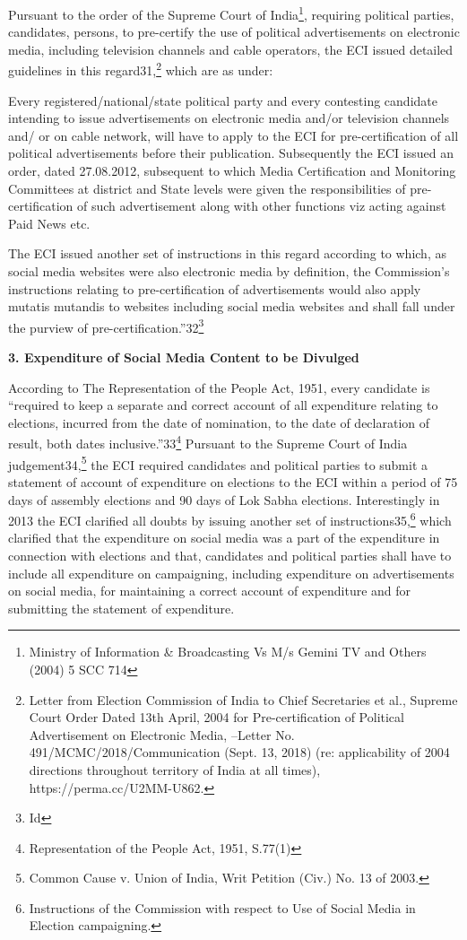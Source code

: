 \begin{multicols}{2}
\noi
Pursuant to the order of the Supreme Court of India\footnote{ Ministry of Information & Broadcasting Vs M/s Gemini TV and Others (2004) 5 SCC 714}, requiring political parties, candidates,
persons, to pre-certify the use of political advertisements on electronic media, including
television channels and cable operators, the ECI issued detailed guidelines in this regard31,\footnote{Letter from Election Commission of India to Chief Secretaries et al., Supreme Court Order Dated 13th April, 2004 for Pre-certification of Political Advertisement on Electronic Media, –Letter No. 491/MCMC/2018/Communication (Sept. 13, 2018) (re: applicability of 2004 directions throughout territory of India at all times), https://perma.cc/U2MM-U862.} which are as under:

\noi
Every registered/national/state political party and every contesting candidate intending to
issue advertisements on electronic media and/or television channels and/ or on cable network,
will have to apply to the ECI for pre-certification of all political advertisements before their
publication. Subsequently the ECI issued an order, dated 27.08.2012, subsequent to which
Media Certification and Monitoring Committees at district and State levels were given the
responsibilities of pre-certification of such advertisement along with other functions viz
acting against Paid News etc.

\noi
The ECI issued another set of instructions in this regard according to which, as social media
websites were also electronic media by definition, the Commission’s instructions relating to 
pre-certification of advertisements would also apply mutatis mutandis to websites including
social media websites and shall fall under the purview of pre-certification.”32\footnote{Id}

\noi
{\large\bfseries 3. Expenditure of Social Media Content to be Divulged}

\noi
According to The Representation of the People Act, 1951, every candidate is “required to
keep a separate and correct account of all expenditure relating to elections, incurred from the
date of nomination, to the date of declaration of result, both dates inclusive.”33\footnote{Representation of the People Act, 1951, S.77(1)} Pursuant to
the Supreme Court of India judgement34,\footnote{Common Cause v. Union of India, Writ Petition (Civ.) No. 13 of 2003.} the ECI required candidates and political parties to
submit a statement of account of expenditure on elections to the ECI within a period of 75
days of assembly elections and 90 days of Lok Sabha elections. Interestingly in 2013 the ECI
clarified all doubts by issuing another set of instructions35,\footnote{Instructions of the Commission with respect to Use of Social Media in Election campaigning.} which clarified that the
expenditure on social media was a part of the expenditure in connection with elections and
that, candidates and political parties shall have to include all expenditure on campaigning,
including expenditure on advertisements on social media, for maintaining a correct account
of expenditure and for submitting the statement of expenditure.


\end{multicols}
